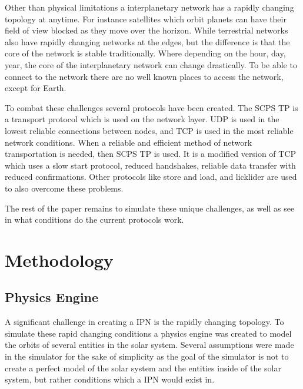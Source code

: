 \documentclass[a4paper,12pt]{article}
\begin{document}
Other than physical limitations a interplanetary network has a rapidly changing topology at anytime. For instance satellites 
which orbit planets can have their field of view blocked as they move over the horizon. While terrestrial networks also have 
rapidly changing networks at the edges, but the difference is that the core of the network is stable traditionally. Where 
depending on the hour, day, year, the core of the interplanetary network can change drastically. To be able to connect to the 
network there are no well known places to access the network, except for Earth. 

To combat these challenges several protocols have been created. The SCPS TP is a transport protocol which is used on the network 
layer. UDP is used in the lowest reliable connections between nodes, and TCP is used in the most reliable network 
conditions. When a reliable and efficient method of network transportation is needed, then SCPS TP is used. It is a modified 
version of TCP which uses a slow start protocol, reduced handshakes, reliable data transfer with reduced confirmations. Other 
protocols like store and load, and licklider are used to also overcome these problems.

The rest of the paper remains to simulate these unique challenges, as well as see in what conditions do the current protocols 
work.

\section{Methodology}

\subsection{Physics Engine}

A significant challenge in creating a IPN is the rapidly changing topology. To
simulate these rapid changing conditions a physics engine was created to model
the orbits of several entities in the solar system. Several assumptions were
made in the simulator for the sake of simplicity as the goal of the simulator is
not to create a perfect model of the solar system and the entities inside of the
solar system, but rather conditions which a IPN would exist in.
\end{document}
